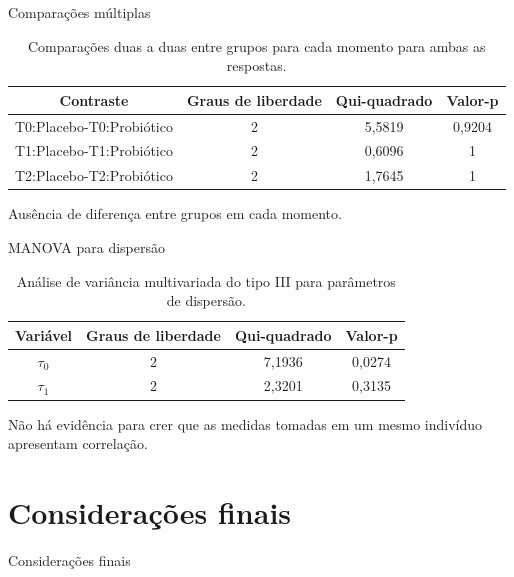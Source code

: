 \documentclass[
  ignorenonframetext,
  serif,
  professionalfont,
  usenames,
  dvipsnames,
  aspectratio = 169]{beamer}
\begin{document}
\begin{frame}{Comparações múltiplas}
\protect\hypertarget{comparauxe7uxf5es-muxfaltiplas-1}{}
\begin{table}[H]
\centering
\begin{tabular}{cccc}
\hline
Contraste                & Graus de liberdade & Qui-quadrado & Valor-p \\ \hline
T0:Placebo-T0:Probiótico & 2                  & 5,5819       & 0,9204  \\
T1:Placebo-T1:Probiótico & 2                  & 0,6096       & 1       \\
T2:Placebo-T2:Probiótico & 2                  & 1,7645       & 1       \\ \hline
\end{tabular}
\caption{Comparações duas a duas entre grupos para cada momento para ambas as respostas.}
\label{tab:mul-multcomp3}
\end{table}

Ausência de diferença entre grupos em cada momento.
\end{frame}

\begin{frame}{MANOVA para dispersão}
\protect\hypertarget{manova-para-dispersuxe3o}{}
\begin{table}[H]
\centering
\begin{tabular}{cccc}
\hline
Variável               & Graus de liberdade & Qui-quadrado & Valor-p        \\ \hline
$\tau_0$ & 2                  & 7,1936       & 0,0274 \\
$\tau_1$ & 2                  & 2,3201       & 0,3135         \\ \hline
\end{tabular}
\caption{Análise de variância multivariada do tipo III para parâmetros de dispersão.}
\label{tab:manova_disp}
\end{table}

Não há evidência para crer que as medidas tomadas em um mesmo indivíduo
apresentam correlação.
\end{frame}

\hypertarget{considerauxe7uxf5es-finais}{%
\section{Considerações finais}\label{considerauxe7uxf5es-finais}}

\begin{frame}{Considerações finais}
\end{frame}
\end{document}
